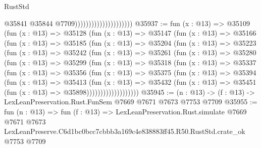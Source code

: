 \begin{lexlean}{RustStd}
\begin{coremodule}
                                              @35841
                                              @35844
                                              @7709)))))))))))))))))))))
@35937 := fun (x : @13) =>
  @35109
    (fun (x : @13) =>
    @35128
      (fun (x : @13) =>
      @35147
        (fun (x : @13) =>
        @35166
          (fun (x : @13) =>
          @35185
            (fun (x : @13) =>
            @35204
              (fun (x : @13) =>
              @35223
                (fun (x : @13) =>
                @35242
                  (fun (x : @13) =>
                  @35261
                    (fun (x : @13) =>
                    @35280
                      (fun (x : @13) =>
                      @35299
                        (fun (x : @13) =>
                        @35318
                          (fun (x : @13) =>
                          @35337
                            (fun (x : @13) =>
                            @35356
                              (fun (x : @13) =>
                              @35375
                                (fun (x : @13) =>
                                @35394
                                  (fun (x : @13) =>
                                  @35413
                                    (fun (x : @13) =>
                                    @35432
                                      (fun (x : @13) =>
                                      @35451 (fun (x : @13) => @35898)))))))))))))))))))
@35945 := (n : @13) -> (f : @13) -> LexLeanPreservation.Rust.FunSem @7669 @7671 @7673 @7753 @7709
@35955 := fun (n : @13) =>
  fun (f : @13) =>
  LexLeanPreservation.Rust.simulate
    @7669
    @7671
    @7673
    LexLeanPreserve.C6d1bc0bcc7cbbb3a169c4e838883ff45.R50.RustStd.crate_ok
    @7753
    @7709
\end{coremodule}
\end{lexlean}
